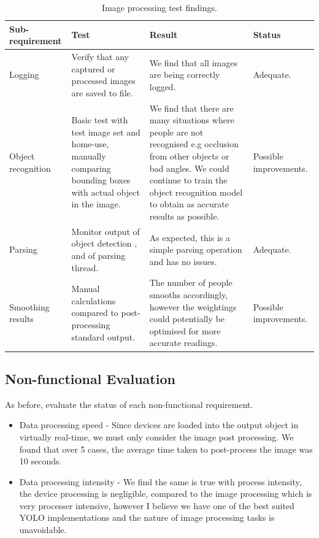 \documentclass{l4proj}
\begin{document}
\begin{table}
\begin{tabularx}{\textwidth}{|X|X|X|X|}
\hline
\textbf{Sub-requirement} & \textbf{Test} & \textbf{Result} & \textbf{Status}\tabularnewline
\hline
Logging & Verify that any captured or processed images are saved to file. &  We find that all images are being correctly logged. & Adequate. \\
\hline 
Object recognition & Basic test with test image set and home-use, manually comparing bounding boxes with actual object in the image. & We find that there are many situations where people are not recognised e.g occlusion from other objects or bad angles. We could continue to train the object recognition model to obtain as accurate results as possible. & Possible improvements. \\
\hline
Parsing & Monitor output of object detection , and of parsing thread. & As expected, this is a simple parsing operation and has no issues. & Adequate.\\
\hline
Smoothing results  & Manual calculations compared to post-processing standard output. & The number of people smooths accordingly, however the weightings could potentially be optimised for more accurate readings. & Possible improvements.\\
\hline
\end{tabularx}
\caption{Image processing test findings.}
\label{table:imgproc}
\end{table}



\subsection{Non-functional Evaluation}
As before, evaluate the status of each non-functional requirement.

\begin{itemize}	
  \item Data processing speed - Since devices are loaded into the output object in virtually real-time, we must only consider the image post processing. We found that over 5 cases, the average time taken to post-process the image was 10 seconds.
  \item Data processing intensity  - We find the same is true with process intensity, the device processing is negligible, compared to the image processing which is very processer intensive, however I believe we have one of the best suited YOLO implementations and the nature of image processing tasks is unavoidable.
\end{itemize}
\end{document}
